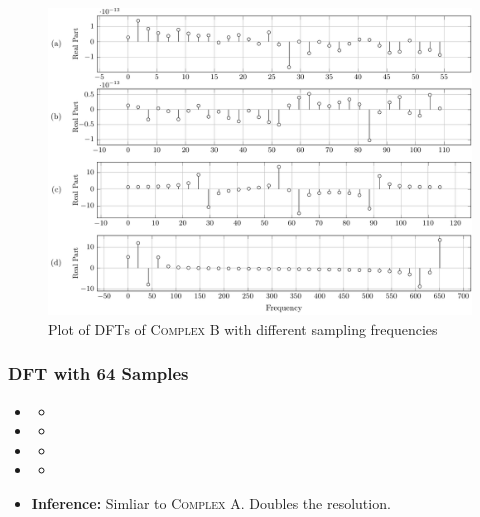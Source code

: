 \documentclass[../../course]{subfiles}
\begin{document}
\begin{figure} [H]
    \centering
     {
        \includegraphics[height = 0.8\textheight] {tikzpics/plotDftComplexB32.pdf}
    }
     {Plot of \textsc{DFT}s of \textsc{Complex B} with different sampling frequencies}
    \label{plt:dftComplexB}
\end{figure}

\subsubsection{DFT with 64 Samples}

\begin{itemize} [label=]

    \item \sampFreqMuchLess
        \begin{itemize} [label=]
            \item
        \end{itemize}

    \item \sampFreqNorm
        \begin{itemize} [label=]
            \item
        \end{itemize}

    \item \sampFreqSligGreat
        \begin{itemize} [label=]
            \item
        \end{itemize}

    \item \sampFreqMuchGreat
        \begin{itemize} [label=]
            \item
        \end{itemize}

    \item \textbf{Inference:} Simliar to \textsc{Complex A}. Doubles the resolution.

\end{itemize}
\end{document}
